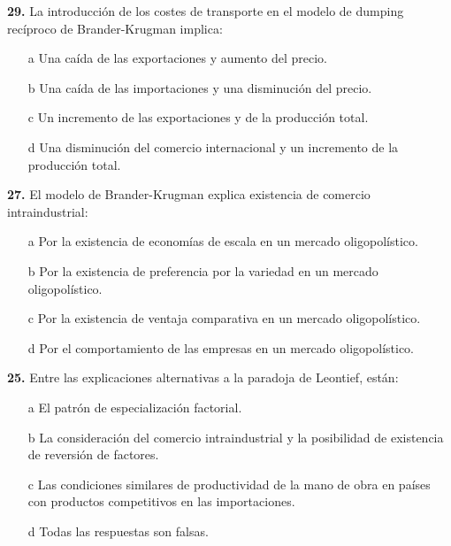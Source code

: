 \documentclass{nuevotema}
\begin{document}
\textbf{29.} La introducción de los costes de transporte en el modelo de dumping recíproco de Brander-Krugman implica:
\begin{itemize}
	\item[a] Una caída de las exportaciones y aumento del precio.
	\item[b] Una caída de las importaciones y una disminución del precio.
	\item[c] Un incremento de las exportaciones y de la producción total.
	\item[d] Una disminución del comercio internacional y un incremento de la producción total.
\end{itemize}

\textbf{27.} El modelo de Brander-Krugman explica existencia de comercio intraindustrial:
\begin{itemize}
	\item[a] Por la existencia de economías de escala en un mercado oligopolístico.
	\item[b] Por la existencia de preferencia por la variedad en un mercado oligopolístico.
	\item[c] Por la existencia de ventaja comparativa en un mercado oligopolístico.
	\item[d] Por el comportamiento de las empresas en un mercado oligopolístico.
\end{itemize}

\textbf{25.} Entre las explicaciones alternativas a la paradoja de Leontief, están:
\begin{itemize}
	\item[a] El patrón de especialización factorial.
	\item[b] La consideración del comercio intraindustrial y la posibilidad de existencia de reversión de factores.
	\item[c] Las condiciones similares de productividad de la mano de obra en países con productos competitivos en las importaciones.
	\item[d] Todas las respuestas son falsas.
\end{itemize}
\end{document}

